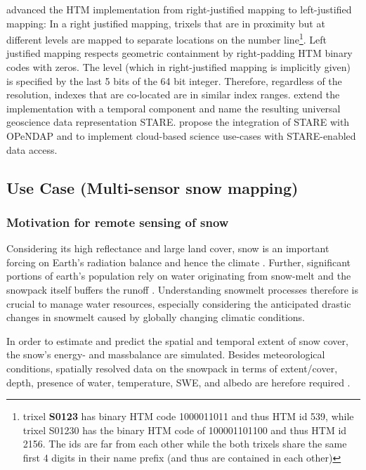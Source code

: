 \documentclass[letterpaper, parskip=half]{scrartcl}
\begin{document}
\cite{Rilee2016} advanced the HTM implementation from right-justified mapping to left-justified mapping:
In a right justified mapping, trixels that are in proximity but at different levels are mapped to separate locations on the number line\footnote{trixel \textbf{S0123} has binary HTM code 1000011011 and thus HTM id 539, while trixel S01230 has the binary HTM code of 100001101100 and thus HTM id 2156. The ids are far from each other while the both trixels share the same first 4 digits in their name prefix (and thus are contained in each other)}.
Left justified mapping respects geometric containment by right-padding HTM binary codes with zeros.
The level (which in right-justified mapping is implicitly given) is specified by the last 5 bits of the 64 bit integer. Therefore, regardless of the resolution, indexes that are co-located are in similar index ranges.
\cite{Kuo2017} extend the implementation with a temporal component and name the resulting universal geoscience data representation \gls{STARE}.
\cite{Rilee2018} propose the integration of \gls{STARE} with \gls{OPeNDAP} and to implement cloud-based science use-cases with \gls{STARE}-enabled data access.

\newpage

\subsection{Use Case (Multi-sensor snow mapping)}

    
\subsubsection{Motivation for remote sensing of snow}
Considering its high reflectance and large land cover, snow is an important forcing on Earth's radiation balance and hence the climate \citep{Durand2017}.
Further, significant portions of earth's population rely on water originating from snow-melt \citep{Barnett2005, Durand2017} and the snowpack itself buffers the runoff \citep{Lettenmaier2015}.
Understanding snowmelt processes therefore is crucial to manage water resources, especially considering the anticipated drastic changes in snowmelt caused by globally changing climatic conditions. 

In order to estimate and predict the spatial and temporal extent of snow cover, the snow's energy- and massbalance are simulated. Besides meteorological conditions, spatially resolved data on the snowpack in terms of extent/cover, depth, presence of water, temperature, \gls{SWE}, and albedo are herefore required \citep{Dozier2004}.
\end{document}
